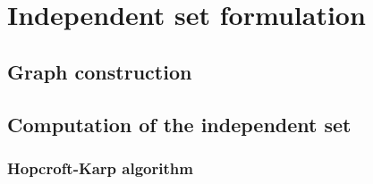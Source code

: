 \chapter{Independent set formulation} \label{chap:independent_set}
\section{Graph construction}
\section{Computation of the independent set}
\subsection{Hopcroft-Karp algorithm}


